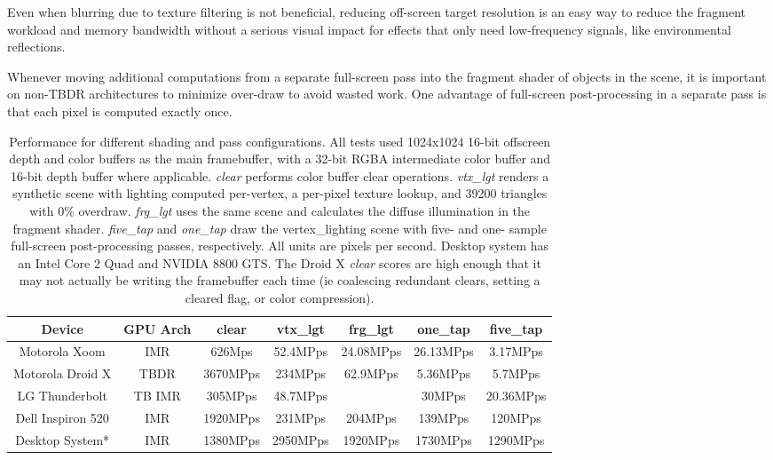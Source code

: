 Even when blurring due to texture filtering is not beneficial, reducing
off-screen target resolution is an easy way to reduce the fragment workload
and memory bandwidth without a serious visual impact for effects that only need
low-frequency signals, like environmental reflections.

Whenever moving additional computations from a separate full-screen pass into
the fragment shader of objects in the scene, it is important on non-TBDR
architectures to minimize over-draw to avoid wasted work.  One advantage of
full-screen post-processing in a separate pass is that each pixel is computed
exactly once.

\begin{table}[htb]
\begin{tabular}{|c|c|c|c|c|c|c|} 
\hline \small{Device} & \small{GPU Arch} & \small{clear} & \small{vtx\_lgt} & \small{frg\_lgt} & \small{one\_tap} & \small{five\_tap}  \\ \hline 
\hline \small{Motorola Xoom} & IMR &\small{626Mps} & \small{52.4MPps}&  \small{24.08MPps} & \small{26.13MPps} & \small{3.17MPps} \\ 
\hline \small{Motorola Droid X} & TBDR & \small{3670MPps\footnotemark[1]} & \small{234MPps}& \small{62.9MPps} & \small{5.36MPps} & \small{5.7MPps} \\ 
\hline \small{LG Thunderbolt} & TB IMR &\small{305MPps} & \small{48.7MPps}& & \small{30MPps} & \small{20.36MPps} \\ 
\hline \hline \small{Dell Inspiron 520} & IMR & \small{1920MPps} & \small{231MPps}& \small{204MPps} & \small{139MPps} & \small{120MPps} \\ 
\hline \small{Desktop System*} & IMR &\small{1380MPps} & \small{2950MPps}& \small{1920MPps} & \small{1730MPps} & \small{1290MPps} \\ 
\hline
\end{tabular} 
 \caption{Performance for different shading and pass
configurations.  All tests used 1024x1024 16-bit offscreen depth and color
buffers as the main framebuffer, with a 32-bit RGBA intermediate color buffer
and 16-bit depth buffer where applicable.  \textit{clear} performs color buffer
clear operations.  \textit{vtx\_lgt} renders a synthetic scene with lighting
computed per-vertex, a per-pixel texture lookup, and 39200 triangles with 0\%
overdraw.  \textit{frg\_lgt} uses the same scene and
calculates the diffuse illumination in the fragment shader.
\textit{five\_tap} and \textit{one\_tap} draw the vertex\_lighting
scene with five- and one- sample full-screen post-processing passes,
respectively.  All units are pixels per second.  Desktop system has an Intel
Core 2 Quad and NVIDIA 8800 GTS.  The Droid X \textit{clear} scores are high enough
that it may not actually be writing the framebuffer each time (ie coalescing redundant clears, setting a cleared flag, or color compression).  }
\label{JonMcCaffrey:pass_performance} \end{table}

